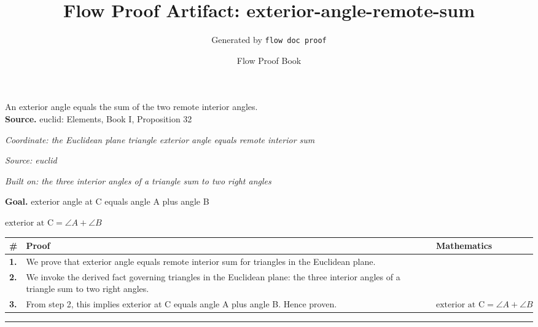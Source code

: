 \documentclass[11pt]{article}
\title{Flow Proof Artifact: exterior-angle-remote-sum}
\author{Generated by \texttt{flow doc proof}}
\date{Flow Proof Book}
\theoremstyle{definition}
\begin{document}
\maketitle
An exterior angle equals the sum of the two remote interior angles.\\[0.5em]
\textbf{Source.} euclid: Elements, Book I, Proposition 32\\[0.5em]
\bigskip
{}\par
\smallskip\noindent\textit{Coordinate: the Euclidean plane \cdot triangle \cdot exterior angle equals remote interior sum}\par
\smallskip\noindent\textit{Source: euclid}\par
\smallskip\noindent\textit{Built on: the three interior angles of a triangle sum to two right angles}\par
\medskip
\noindent\textbf{Goal.} exterior angle at C equals angle A plus angle B\par
\noindent$\displaystyle \text{exterior at C} = \angle A + \angle B$\par
\medskip
\noindent
\begin{tabular}{@{} >{\raggedright\arraybackslash}p{} >{\raggedright\arraybackslash}p{} >{\raggedleft\arraybackslash}p{} @{}}
\textbf{\#} & \textbf{Proof} & \textbf{Mathematics} \\
\midrule
\textbf{1.} & We prove that exterior angle equals remote interior sum for triangles in the Euclidean plane. & \\[0.45em]
\textbf{2.} & We invoke the derived fact governing triangles in the Euclidean plane: the three interior angles of a triangle sum to two right angles. & \\[0.45em]
\textbf{3.} & From step 2, this implies exterior at C equals angle A plus angle B. Hence proven. & $\displaystyle \text{exterior at C} = \angle A + \angle B$ \\[0.45em]
\bottomrule
\end{tabular}
\label{thm:Geometry-triangle-exterior_angle_equals_remote_interior_sum}
\par\medskip\hrule
\end{document}
